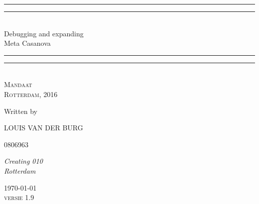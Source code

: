 \newcommand*{\titleGP}{\begingroup %
\centering %
\vspace*{\baselineskip} %

\rule{\textwidth}{1.6pt}\vspace*{-\baselineskip}\vspace*{2pt} %
\rule{\textwidth}{0.4pt}\\[0.5\baselineskip] %

{\LARGE Debugging and expanding \\ [0.4\baselineskip] Meta Casanova }\\[0.2\baselineskip] %

\rule{\textwidth}{0.4pt}\vspace*{-\baselineskip}\vspace{3.2pt} %
\rule{\textwidth}{1.6pt}\\[\baselineskip] %

\scshape %
Mandaat\\[\baselineskip] %
Rotterdam, 2016\par %

\vspace*{3\baselineskip} %

Written by \\[0.3\baselineskip]
{\Large LOUIS VAN DER BURG \par} %
{\small 0806963 } \\[0.3\baselineskip] %
{\itshape Creating 010 \\ Rotterdam\par} %

\vspace*{1.5\baselineskip} %

\vfill %

{\scshape \today} \\[0.3\baselineskip] %
{\scshape versie 1.9} \\[0.3\baselineskip] %

\endgroup}


%


\titleGP %

%
